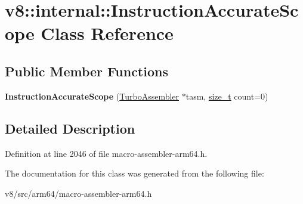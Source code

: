 \hypertarget{classv8_1_1internal_1_1InstructionAccurateScope}{}\section{v8\+:\+:internal\+:\+:Instruction\+Accurate\+Scope Class Reference}
\label{classv8_1_1internal_1_1InstructionAccurateScope}
\subsection*{Public Member Functions}
\begin{DoxyCompactItemize}
\item 
\mbox{\label{classv8_1_1internal_1_1InstructionAccurateScope_a9c3c99b3b1fb108c1e0b6b0549d3070d}} 
{\bfseries Instruction\+Accurate\+Scope} (\mbox{\hyperlink{classv8_1_1internal_1_1TurboAssembler}{Turbo\+Assembler}} $\ast$tasm, \mbox{\hyperlink{classsize__t}{size\+\_\+t}} count=0)
\end{DoxyCompactItemize}


\subsection{Detailed Description}


Definition at line 2046 of file macro-\/assembler-\/arm64.\+h.



The documentation for this class was generated from the following file\+:\begin{DoxyCompactItemize}
\item 
v8/src/arm64/macro-\/assembler-\/arm64.\+h\end{DoxyCompactItemize}
